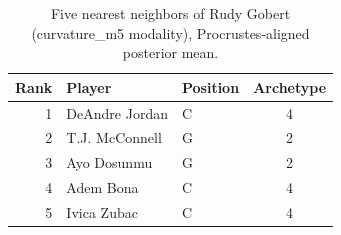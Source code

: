 \begin{table}[htbp]
  \centering\small
  \begin{tabular}{rllc}
    \toprule
    Rank & Player & Position & Archetype \\
    \midrule
    1 & DeAndre Jordan & C & 4 \\
    2 & T.J. McConnell & G & 2 \\
    3 & Ayo Dosunmu & G & 2 \\
    4 & Adem Bona & C & 4 \\
    5 & Ivica Zubac & C & 4 \\
    \bottomrule
  \end{tabular}
  \caption{Five nearest neighbors of Rudy Gobert (curvature_m5 modality), Procrustes-aligned posterior mean.}
  \label{tab:Rudy_Gobert_neighbors_curvature_m5}
\end{table}


